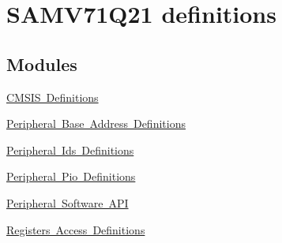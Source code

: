 \hypertarget{group__SAMV71Q21__definitions}{}\section{S\+A\+M\+V71\+Q21 definitions}
\label{group__SAMV71Q21__definitions}
\subsection*{Modules}
\begin{DoxyCompactItemize}
\item 
\mbox{\hyperlink{group__SAMV71Q21__cmsis}{C\+M\+S\+I\+S Definitions}}
\item 
\mbox{\hyperlink{group__SAMV71Q21__base}{Peripheral Base Address Definitions}}
\item 
\mbox{\hyperlink{group__SAMV71Q21__id}{Peripheral Ids Definitions}}
\item 
\mbox{\hyperlink{group__SAMV71Q21__pio}{Peripheral Pio Definitions}}
\item 
\mbox{\hyperlink{group__SAMV71Q21__api}{Peripheral Software A\+PI}}
\item 
\mbox{\hyperlink{group__SAMV71Q21__reg}{Registers Access Definitions}}
\end{DoxyCompactItemize}
